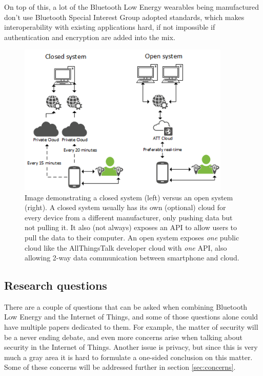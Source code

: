 \documentclass[pdftex,a4paper,12pt,twoside]{report}
\begin{document}
On top of this, a lot of the Bluetooth Low Energy wearables being manufactured don't use Bluetooth Special Interest Group adopted standards, which makes interoperability with existing applications hard, if not impossible if authentication and encryption are added into the mix.

\begin{figure}[h]
    \centering
    \includegraphics[width=0.9\textwidth]{img/networkloop.png}
    \caption[Image demonstrating a closed cloud system versus an open cloud system]{Image demonstrating a closed system (left) versus an open system (right). A closed system usually has its own (optional) cloud for every device from a different manufacturer, only pushing data but not pulling it. It also (not always) exposes an API to allow users to pull the data to their computer. An open system exposes \textit{one} public cloud like the AllThingsTalk developer cloud with \textit{one} API, also allowing 2-way data communication between smartphone and cloud.}
    \label{fig:networkloops}
\end{figure}

\subsection{Research questions}
\label{subsec:researchquestions}
There are a couple of questions that can be asked when combining Bluetooth Low Energy and the Internet of Things, and some of those questions alone could have multiple papers dedicated to them. For example, the matter of security will be a never ending debate, and even more concerns arise when talking about security in the Internet of Things. Another issue is privacy, but since this is very much a gray area it is hard to formulate a one-sided conclusion on this matter. Some of these concerns will be addressed further in section \ref{sec:concerns}.
\end{document}
